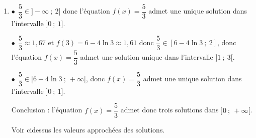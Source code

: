 \begin{enumerate}
\begin{enumerate}
$f(1)=1+4-4\ln(1)-\dfrac{3}{1}=2$;
$f(3) = 3+4-4\ln(3) - \dfrac{3}{3}=6-4\ln(3)\approx 1,69$

On établit le tableau des variations de $f$ en admettant que que $\displaystyle\lim_{x \to 0} f(x) = - \infty$:

\begin{center}
{\renewcommand{\arraystretch}{1.3}
\def\esp{\hspace*{1.5cm}}%
\def\hauteur{20pt}%
$\begin{array}{|c|l *5{c} c|}
\hline
 x & 0 & \esp & 1 & \esp & 3 & \esp & +\infty \\
 \hline
f'(x) & \vline\;\vline\; &  \pmb{+} & \vline\hspace{-2.7pt}0 & \pmb{-} & \vline\hspace{-2.7pt}0 & \pmb{+} & \\  
\hline
  & \vline\;\vline\; &  & \Rnode{max1}{2} & & & &  \Rnode{max2}{+\infty} \\
f (x) &\vline\;\vline\; &  & & & & & \rule{0pt}{\hauteur}\\
 &\vline\;\vline\; \Rnode{min1}{-\infty} & & & & \Rnode{min2}{6-4\ln(3)\approx 1,61} & & \rule{0pt}{\hauteur} 
\ncline{->}{min1}{max1} 
\ncline{->}{max1}{min2}
\ncline{->}{min2}{max2} \\
\hline
\end{array}$
}
\end{center}

		\item %
$\bullet~~$$\dfrac{5}{3}\in ]-\infty~;~2]$ donc l'équation $f(x) =\dfrac{5}{3}$ admet une unique solution dans l'intervalle $]0~;~1]$.

$\bullet~~$$\dfrac{5}{3} \approx 1,67$ et $f(3) = 6 - 4\ln 3 \approx 1,61$ donc $\dfrac{5}{3} \in [6 - 4\ln 3~;~2]$, donc l'équation $f(x)=\dfrac{5}{3}$ admet une solution unique dans l'intervalle $]1~;~3[$.

$\bullet~~$$\dfrac{5}{3} \in [6 - 4\ln 3~;~+ \infty[$, donc $f(x) =\dfrac{5}{3}$ admet une unique solution dans l'intervalle $]0~;~1]$.

Conclusion : l'équation $f(x)=\dfrac{5}{3}$ admet donc trois solutions dans $]0~;~+\infty[$.

Voir cidessus les valeurs approchées des solutions.
	\end{enumerate}


\end{enumerate}
